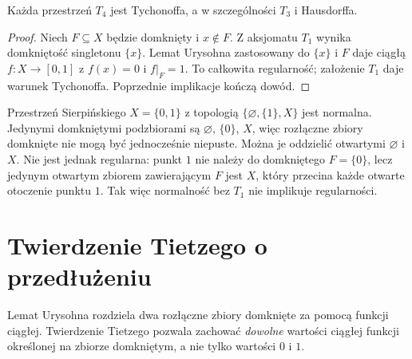\begin{wniosek}
\label{cor:topog-t4-tych}
Każda przestrzeń $T_4$ jest Tychonoffa, a w szczególności $T_3$
i Hausdorffa.
\end{wniosek}
\begin{proof}
Niech $F\subseteq X$ będzie domknięty i $x\notin F$.
Z aksjomatu $T_1$ wynika domkniętość singletonu $\{x\}$.
Lemat Urysohna zastosowany do $\{x\}$ i $F$ daje
ciągłą $f\colon X\to[0,1]$ z $f(x)=0$ i $f|_F=1$.
To całkowita regularność; założenie $T_1$ daje warunek
Tychonoffa. Poprzednie implikacje kończą dowód.
\end{proof}

\begin{przyklad}
\label{ex:topog-normalna-nie-regularna}
Przestrzeń Sierpińskiego $X=\{0,1\}$ z topologią
$\{\varnothing,\{1\},X\}$ jest normalna. Jedynymi
domkniętymi podzbiorami są $\varnothing$, $\{0\}$, $X$,
więc rozłączne zbiory domknięte nie mogą być jednocześnie
niepuste. Można je oddzielić otwartymi $\varnothing$
i $X$. Nie jest jednak regularna: punkt $1$ nie należy
do domkniętego $F=\{0\}$, lecz jedynym otwartym zbiorem
zawierającym $F$ jest $X$, który przecina każde otwarte
otoczenie punktu $1$. Tak więc normalność bez $T_1$
nie implikuje regularności.
\end{przyklad}

\section{Twierdzenie Tietzego o przedłużeniu}
\label{sec:topog-tietze}

Lemat Urysohna rozdziela dwa rozłączne zbiory domknięte
za pomocą funkcji ciągłej. Twierdzenie Tietzego pozwala
zachować \emph{dowolne} wartości ciągłej funkcji określonej
na zbiorze domkniętym, a nie tylko wartości $0$ i $1$.

